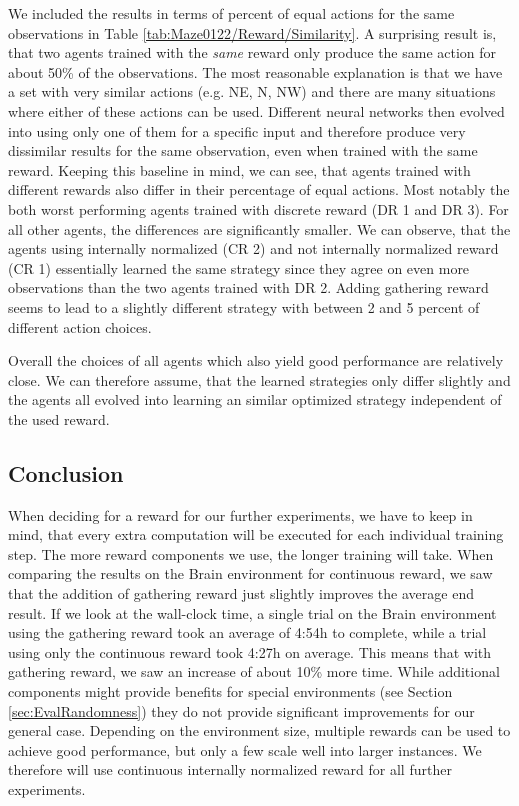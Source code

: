 We included the results in terms of percent of equal actions for the same observations in Table \ref{tab:Maze0122/Reward/Similarity}. A surprising result is, that two agents trained with the \textit{same} reward only produce the same action for about 50\% of the observations. The most reasonable explanation is that we have a set with very similar actions (e.g. NE, N, NW) and there are many situations where either of these actions can be used. Different neural networks then evolved into using only one of them for a specific input and therefore produce very dissimilar results for the same observation, even when trained with the same reward. Keeping this baseline in mind, we can see, that agents trained with different rewards also differ in their percentage of equal actions. Most notably the both worst performing agents trained with discrete reward (DR 1 and DR 3). For all other agents, the differences are significantly smaller. We can observe, that the agents using internally normalized (CR 2) and not internally normalized reward (CR 1) essentially learned the same strategy since they agree on even more observations than the two agents trained with DR 2. Adding gathering reward seems to lead to a slightly different strategy with between 2 and 5 percent of different action choices. 

Overall the choices of all agents which also yield good performance are relatively close. We can therefore assume, that the learned strategies only differ slightly and the agents all evolved into learning an similar optimized strategy independent of the used reward. 

\subsection{Conclusion} \label{sec:RewardConclusion}
When deciding for a reward for our further experiments, we have to keep in mind, that every extra computation will be executed for each individual training step. The more reward components we use, the longer training will take. When comparing the results on the Brain environment for continuous reward, we saw that the addition of gathering reward just slightly improves the average end result. If we look at the wall-clock time, a single trial on the Brain environment using the gathering reward took an average of 4:54h to complete, while a trial using only the continuous reward took 4:27h on average. This means that with gathering reward, we saw an increase of about 10\% more time. While additional components might provide benefits for special environments (see Section \ref{sec:EvalRandomness}) they do not provide significant improvements for our general case. Depending on the environment size, multiple rewards can be used to achieve good performance, but only a few scale well into larger instances. We therefore will use continuous internally normalized reward for all further experiments.

